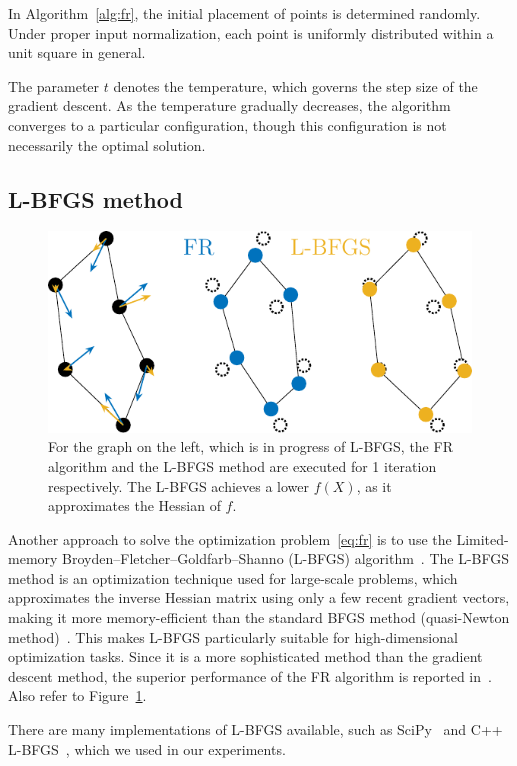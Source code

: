 \documentclass[dvipdfmx,lettersize,journal]{IEEEtran}
\begin{document}
In Algorithm~\ref{alg:fr}, the initial placement of points is determined randomly. Under proper input normalization, each point is uniformly distributed within a unit square in general.

The parameter $t$ denotes the temperature, which governs the step size of the gradient descent. As the temperature gradually decreases, the algorithm converges to a particular configuration, though this configuration is not necessarily the optimal solution.

\subsection{L-BFGS method}\label{ssec:lbfgs}

\begin{figure}[t]
  \centering
  \includegraphics[width=0.804\columnwidth]{comparison/comparison_FRandLBFGS.pdf}
  \caption{
    For the graph on the left, which is in progress of L-BFGS, the FR algorithm and the L-BFGS method are executed for 1 iteration respectively.
    The L-BFGS achieves a lower $f(X)$, as it approximates the Hessian of $f$.
  }
  \label{fig:comparisonFRandLBFGS}
\end{figure}

Another approach to solve the optimization problem~\eqref{eq:fr} is to use the Limited-memory Broyden--Fletcher--Goldfarb--Shanno (L-BFGS) algorithm~\cite{6183577}.
The L-BFGS method is an optimization technique used for large-scale problems, which approximates the inverse Hessian matrix using only a few recent gradient vectors, making it more memory-efficient than the standard BFGS method (quasi-Newton method)~\cite{liuLimitedMemoryBFGS1989}.
This makes L-BFGS particularly suitable for high-dimensional optimization tasks. Since it is a more sophisticated method than the gradient descent method, the superior performance of the FR algorithm is reported in~\cite{6183577}. Also refer to Figure~\ref{fig:comparisonFRandLBFGS}.

There are many implementations of L-BFGS available, such as SciPy~\cite{2020SciPy-NMeth} and C++ L-BFGS~\cite{qiuYixuanLBFGSpp2024,okazakiChokkanLiblbfgs2024}, which we used in our experiments.
\end{document}
